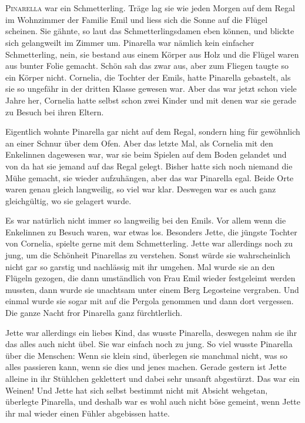 \chapter*{}

\lettrine[lines=3]{\color{red}P}{inarella} war ein Schmetterling. Träge lag sie wie jeden Morgen auf dem Regal im Wohnzimmer der Familie Emil und liess sich die Sonne auf die Flügel scheinen. Sie gähnte, so laut das Schmetterlingsdamen eben können, und blickte sich gelangweilt im Zimmer um. Pinarella war nämlich kein einfacher Schmetterling, nein, sie bestand aus einem Körper aus Holz und die Flügel waren aus bunter Folie gemacht. Schön sah das zwar aus, aber zum Fliegen taugte so ein Körper nicht. Cornelia, die Tochter der Emils, hatte Pinarella gebastelt, als sie so ungefähr in der dritten Klasse gewesen war. Aber das war jetzt schon viele Jahre her, Cornelia hatte selbst schon zwei Kinder und mit denen war sie gerade zu Besuch bei ihren Eltern. 

Eigentlich wohnte Pinarella gar nicht auf dem Regal, sondern hing für gewöhnlich an einer Schnur über dem Ofen. Aber das letzte Mal, als Cornelia mit den Enkelinnen dagewesen war, war sie beim Spielen auf dem Boden gelandet und von da hat sie jemand auf das Regal gelegt. Bisher hatte sich noch niemand die Mühe gemacht, sie wieder aufzuhängen, aber das war Pinarella egal. Beide Orte waren genau gleich langweilig, so viel war klar. Deswegen war es auch ganz gleichgültig, wo sie gelagert wurde.

Es war natürlich nicht immer so langweilig bei den Emils. Vor allem wenn die Enkelinnen zu Besuch waren, war etwas los. Besonders Jette, die jüngste Tochter von Cornelia, spielte gerne mit dem Schmetterling. Jette war allerdings noch zu jung, um die Schönheit Pinarellas zu verstehen. Sonst würde sie wahrscheinlich nicht gar so garstig und nachlässig mit ihr umgehen. Mal wurde sie an den Flügeln gezogen, die dann umständlich von Frau Emil wieder festgeleimt werden mussten, dann wurde sie unachtsam unter einem Berg Legosteine vergraben. Und einmal wurde sie sogar mit auf die Pergola genommen und dann dort vergessen. Die ganze Nacht fror Pinarella ganz fürchtlerlich.

Jette war allerdings ein liebes Kind, das wusste Pinarella, deswegen nahm sie ihr das alles auch nicht übel. Sie war einfach noch zu jung. So viel wusste Pinarella über die Menschen: Wenn sie klein sind, überlegen sie manchmal nicht, was so alles passieren kann, wenn sie dies und jenes machen. Gerade gestern ist Jette alleine in ihr Stühlchen geklettert und dabei sehr unsanft abgestürzt. Das war ein Weinen! Und Jette hat sich selbst bestimmt nicht mit Absicht wehgetan, überlegte Pinarella, und deshalb war es wohl auch nicht böse gemeint, wenn Jette ihr mal wieder einen Fühler abgebissen hatte.


